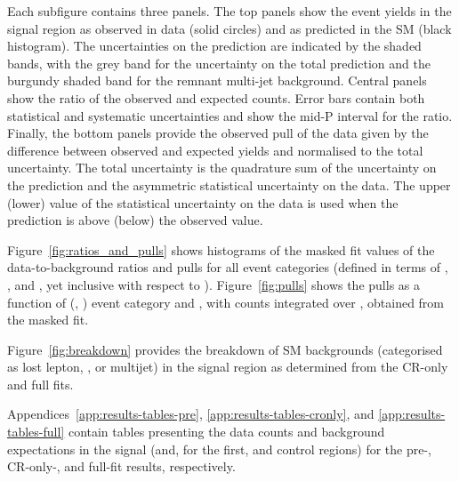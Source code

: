 Each subfigure contains three panels.  The top panels show the event
yields in the signal region as observed in data (solid circles) and as
predicted in the SM (black histogram).  The uncertainties on the
prediction are indicated by the shaded bands, with the grey band for
the uncertainty on the total prediction and the burgundy shaded band
for the remnant multi-jet background. Central panels show the ratio of
the observed and expected counts.  Error bars contain both statistical
and systematic uncertainties and show the mid-P interval for the
ratio. Finally, the bottom panels provide the observed pull of the
data given by the difference between observed and expected yields and
normalised to the total uncertainty.  The total uncertainty is the
quadrature sum of the uncertainty on the prediction and the asymmetric
statistical uncertainty on the data. The upper (lower) value of the
statistical uncertainty on the data is used when the prediction is
above (below) the observed value.


Figure~\ref{fig:ratios_and_pulls} shows histograms of the masked fit
values of the data-to-background ratios and pulls for all event
categories (defined in terms of \njet, \nb, and \scalht, yet inclusive
with respect to \mht). Figure~\ref{fig:pulls} shows the pulls as a
function of (\njet, \nb) event category and \scalht, with counts
integrated over \mht, obtained from the masked fit.

Figure~\ref{fig:breakdown} provides the breakdown of SM backgrounds
(categorised as lost lepton, \znunuj, or multijet) in the signal
region as determined from the CR-only and full fits.

Appendices~\ref{app:results-tables-pre},
\ref{app:results-tables-cronly}, and \ref{app:results-tables-full}
contain tables presenting the data counts and background expectations
in the signal (and, for the first, \mj and \mmj control regions) for
the pre-, CR-only-, and full-fit results, respectively. 

